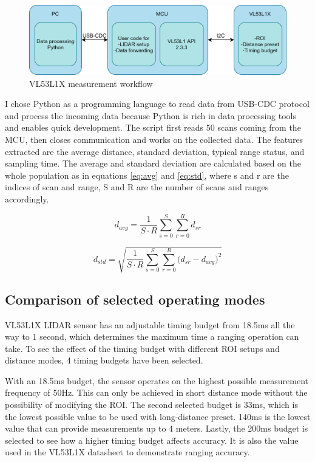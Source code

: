 \begin{figure}[ht]
    \centering
    \includegraphics[width=130mm, keepaspectratio]{figures/vl53l1x_workflow.png}
    \caption{VL53L1X measurement workflow}
    \label{fig:vl53l1x_workflow}
\end{figure}


I chose Python as a programming language to read data from USB-CDC protocol and process the incoming
data because Python is rich in data processing tools and enables quick development. The script first
reads 50 scans coming from the MCU, then closes communication and works on the collected data.
The features extracted are the average distance, standard deviation, typical range status, and sampling
time. The average and standard deviation are calculated based on the whole population as in equations
\ref{eq:avg} and \ref{eq:std}, where s and r are the indices of scan and range, S and R are the
number of scans and ranges accordingly.

\begin{equation} \label{eq:avg}
    d_{avg}=\frac{1}{S \cdot R}\sum_{s=0}^S{\sum_{r=0}^R{d_{sr}} }
\end{equation}

\begin{equation} \label{eq:std}
    d_{std}=\sqrt{ \frac{1}{S\cdot R}\sum_{s=0}^S{ \sum_{r=0}^R{ (d_{sr} -d_{avg}})^2 }}
\end{equation}


\subsection{Comparison of selected operating modes}
VL53L1X LIDAR sensor has an adjustable timing budget from 18.5ms all the way to 1 second, which
determines the maximum time a ranging operation can take. To see the effect of the timing budget with
different ROI setups and distance modes, 4 timing budgets have been selected.

With an 18.5ms budget, the sensor operates on the highest possible measurement frequency of 50Hz. This
can only be achieved in short distance mode without the possibility of modifying the ROI. The second
selected budget is 33ms, which is the lowest possible value to be used with long-distance preset.
140ms is the lowest value that can provide measurements up to 4 meters. Lastly, the 200ms budget is
selected to see how a higher timing budget affects accuracy. It is also the value used in the
VL53L1X datasheet\cite{VL53L1XDatasheet} to demonstrate ranging accuracy.

